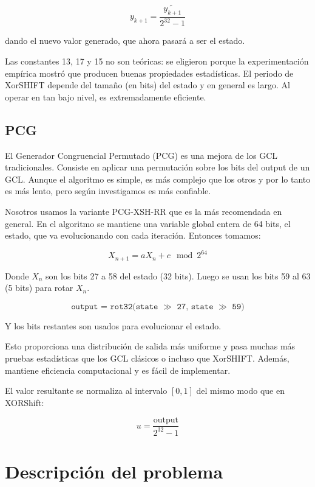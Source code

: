 \documentclass[a4paper, 12pt]{article}
\begin{document}
\begin{equation*}
    y_{k+1} = \frac{\widetilde{y_{k+1}}}{2^{32} - 1}
\end{equation*}

dando el nuevo valor generado, que ahora pasará a ser el estado.

Las constantes 13, 17 y 15 no son teóricas: se eligieron porque la
experimentación empírica mostró que producen buenas propiedades estadísticas. El
periodo de XorSHIFT depende del tamaño (en bits) del estado y en general es
largo. Al operar en tan bajo nivel, es extremadamente eficiente. 


\subsection{PCG}

El Generador Congruencial Permutado (PCG) es una mejora de los GCL
tradicionales. Consiste en aplicar una permutación sobre los bits del output de
un GCL.  
Aunque el algoritmo es simple, es más complejo que los otros y por lo tanto es más lento, pero según investigamos es más confiable.

Nosotros usamos la variante PCG-XSH-RR que es la más recomendada en general.
En el algoritmo se mantiene una variable global entera de 64 bits, el estado, que va evolucionando con cada iteración.
Entonces tomamos:

\[
X_{n+1} = aX_n + c \mod 2^{64}
\]

Donde $X_n$ son los bits 27 a 58 del estado (32 bits). Luego se usan los bits 59 al 63 (5 bits) para rotar $X_n$.

\begin{equation*}
\texttt{output = rot32(state $\gg$ 27, state $\gg$ 59)}
\end{equation*}

Y los bits restantes son usados para evolucionar el estado.

Esto proporciona una distribución de salida más uniforme y pasa muchas más
pruebas estadísticas que los GCL clásicos o incluso que XorSHIFT. Además,
mantiene eficiencia computacional y es fácil de implementar. 

El valor resultante se normaliza al intervalo $[0, 1]$ del mismo modo que en
XORShift:

\begin{equation*}
u = \frac{\text{output}}{2^{32} - 1}
\end{equation*}


\section{Descripción del problema}
\end{document}
